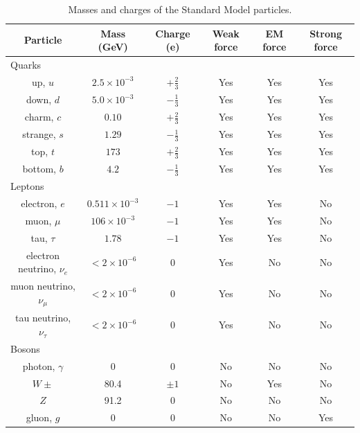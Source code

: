 \begin{table}[htbp]
  \begin{center}
    \caption{Masses and charges of the Standard Model particles.}
    \label{TableSMParticles}
    \begin{tabular}[]{ | c | c | c | c | c | c | }
      \hline
      Particle & Mass (GeV) & Charge (e) & Weak force & EM force & Strong force \\ \hline \hline
      \multicolumn{6}{|l|}{Quarks} \\ \hline 
      up, $u$ & $2.5 \times 10^{-3}$ & $+\frac{2}{3}$ & Yes & Yes & Yes \\ \hline
      down, $d$ & $5.0 \times 10^{-3}$ & $-\frac{1}{3}$ & Yes & Yes & Yes \\ \hline
      charm, $c$ & $0.10$ & $+\frac{2}{3}$ & Yes & Yes & Yes \\ \hline
      strange, $s$ & $1.29$ & $-\frac{1}{3}$ & Yes & Yes & Yes \\ \hline
      top, $t$ & $173$ & $+\frac{2}{3}$ & Yes & Yes & Yes \\ \hline
      bottom, $b$ & $4.2$ & $-\frac{1}{3}$ & Yes & Yes & Yes \\ \hline
      \multicolumn{6}{|l|}{Leptons} \\ \hline
      electron, $e$ & $0.511 \times 10^{-3}$ & $-1$ & Yes & Yes & No \\ \hline
      muon, $\mu$ & $106 \times 10^{-3}$ & $-1$ & Yes & Yes & No \\ \hline
      tau, $\tau$ & $1.78$ & $-1$ & Yes & Yes & No \\ \hline
      electron neutrino, $\nu_e$ & $< 2 \times 10^{-6}$ & $0$ & Yes & No & No \\ \hline
      muon neutrino, $\nu_{\mu}$ & $< 2 \times 10^{-6}$ & $0$ & Yes & No & No \\ \hline
      tau neutrino, $\nu_{\tau}$ & $< 2 \times 10^{-6}$ & $0$ & Yes & No & No \\ \hline
      \multicolumn{6}{|l|}{Bosons} \\ \hline
      photon, $\gamma$ & 0 & $0$ & No & No & No \\ \hline
      $W\pm$ & 80.4 & $\pm 1$ & No & Yes & No \\ \hline
      $Z$ & 91.2 & $0$ & No & No & No \\ \hline
      gluon, $g$ & 0 & $0$ & No & No & Yes \\ \hline
    \end{tabular}
  \end{center}
\end{table}



